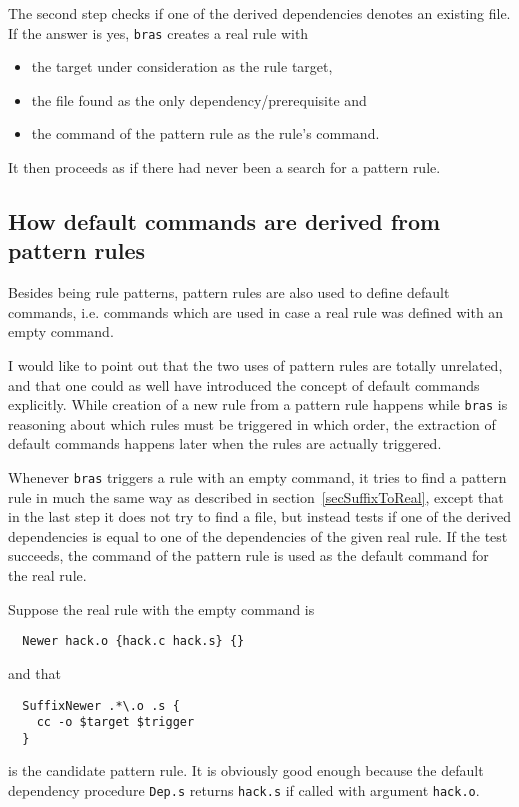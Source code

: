 \documentclass[12pt]{article}
\newcommand{\bras}{\texttt{bras}}
\begin{document}
The second step checks if one of
the derived dependencies denotes an existing file.
If the answer is yes, \bras{} creates a real rule with
\begin{itemize}
\item the target under consideration as the rule target,
\item the file found as the only dependency/prerequisite and
\item the command of the pattern rule as the rule's command.
\end{itemize}
It then proceeds as if there had never been a search for a pattern
rule.

\subsection{How default commands are derived from pattern rules}
\label{secSuffixAsDefCmd}
Besides being rule patterns, pattern rules are also used to define
default commands, i.e. commands which are used in case a real rule was
defined with an empty command.

I would like to point out that the two uses of pattern rules are
totally unrelated, and that one could as well have introduced the
concept of default commands explicitly. While creation of a new rule
from a pattern rule happens while \bras{} is reasoning about which rules
must be triggered in which order, the extraction of default commands
happens later when the rules are actually triggered. 

Whenever \bras{} triggers a rule with an empty command, it tries to
find a pattern rule in much the same way as described in
section~\ref{secSuffixToReal}, except that in the last step it does
not try to find a file, but instead tests if one of the derived
dependencies is equal to one of the dependencies of the given real
rule. If the test succeeds, the command of the pattern rule is used as
the default command for the real rule.

Suppose the real rule with the empty command is
\begin{verbatim}
  Newer hack.o {hack.c hack.s} {}
\end{verbatim}
and that
\begin{verbatim}
  SuffixNewer .*\.o .s {
    cc -o $target $trigger
  }
\end{verbatim}
is the candidate pattern rule. It is obviously good enough
because the default dependency procedure \texttt{Dep.s} returns
\texttt{hack.s} if called with argument \texttt{hack.o}.
\end{document}
